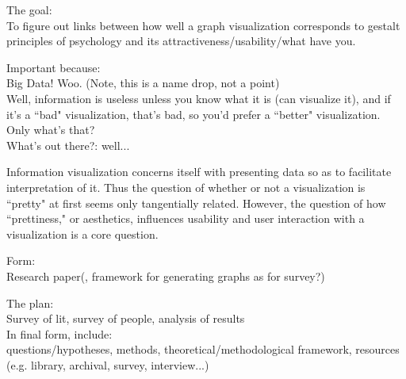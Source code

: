 \documentclass[12pt]{article}
\begin{document}
\newpage
The goal:\\
To figure out links between how well a graph visualization corresponds to gestalt principles of psychology and its attractiveness/usability/what have you.

Important because:\\
Big Data! Woo. (Note, this is a name drop, not a point)\\
Well, information is useless unless you know what it is (can visualize it), and if it's a ``bad" visualization, that's bad, so you'd prefer a ``better" visualization. Only what's that?\\
What's out there?: well...

Information visualization concerns itself with presenting data so as to facilitate interpretation of it. 
Thus the question of whether or not a visualization is ``pretty" at first seems only tangentially related.
However, the question of how ``prettiness," or aesthetics, influences usability and user interaction with a visualization is a core question. 

Form:\\
Research paper(, framework for generating graphs as for survey?)

The plan:\\
Survey of lit, survey of people, analysis of results\\


In final form, include:\\
questions/hypotheses, methods, theoretical/methodological framework, resources (e.g. library, archival, survey, interview...)
\end{document}
